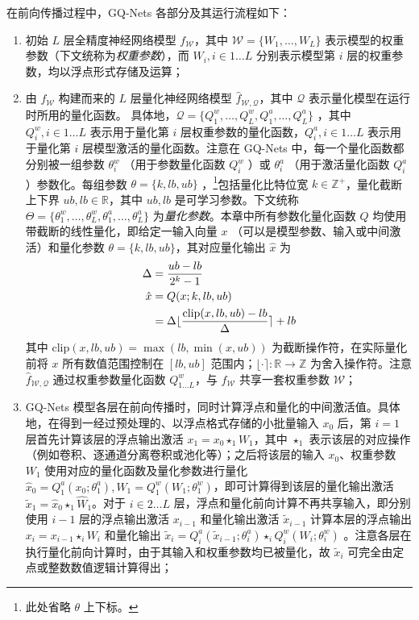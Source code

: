 在前向传播过程中，GQ-Nets 各部分及其运行流程如下：
\begin{enumerate}[1.]
  \item 初始 $L$ 层全精度神经网络模型 $f_{\mathcal{W}}$，其中 $\mathcal{W} = \{W_1, \ldots, W_L\}$ 表示模型的权重参数（下文统称为\emph{权重参数}），而 $W_i, i \in 1 \ldots L$ 分别表示模型第 $i$ 层的权重参数，均以浮点形式存储及运算；
  \item 由 $f_{\mathcal{W}}$ 构建而来的 $L$ 层量化神经网络模型 $\hat{f}_{\mathcal{W}, \mathcal{Q}}$，其中 $\mathcal{Q}$ 表示量化模型在运行时所用的量化函数。 具体地，$\mathcal{Q} = \{Q^w_1, \ldots , Q^w_L, Q^a_1, \ldots , Q^a_L\}$ ，其中 $Q^w_i, i \in 1\ldots L$ 表示用于量化第 $i$ 层权重参数的量化函数，$Q^a_i, i \in 1\ldots L$ 表示用于量化第 $i$ 层模型激活的量化函数。注意在 GQ-Nets 中，每一个量化函数都分别被一组参数 $\theta^w_i$ （用于参数量化函数 $Q^w_i$ ）或 $\theta^a_i$ （用于激活量化函数 $Q^a_i$ ）参数化。每组参数 $\theta = \{k, lb, ub\}$ ，\footnote{此处省略 $\theta$ 上下标。}包括量化比特位宽 $k \in \mathbb{Z}^+$，量化截断上下界 $ub, lb \in \mathbb{R}$，其中 $ub, lb$ 是可学习参数。下文统称 $\Theta = \{\theta^w_1, \ldots , \theta^w_L, \theta^a_1, \ldots , \theta^a_L\}$ 为\emph{量化参数}。本章中所有参数化量化函数 $Q$ 均使用带截断的线性量化，即给定一输入向量 $x$ （可以是模型参数、输入或中间激活）和量化参数 $\theta = \{k, lb, ub\}$，其对应量化输出 $\hat{x}$ 为
  \begin{align}
    \Delta &= \frac{ub - lb}{2^k - 1} \\
    \hat{x} &= Q(x; k, lb, ub) \notag \\
            &= \Delta \lfloor \frac{\mathrm{clip}(x, lb, ub) - lb}{\Delta} \rceil + lb \label{eq::gq_nets::linear_q_func}
  \end{align}
  其中 $\mathrm{clip}(x, lb, ub) = \max(lb, \min(x, ub))$ 为截断操作符，在实际量化前将 $x$ 所有数值范围控制在 $[lb, ub]$ 范围内；$\lfloor\cdot\rceil: \mathbb{R}\to\mathbb{Z}$ 为舍入操作符。注意 $\hat{f}_{\mathcal{W}, \mathcal{Q}}$ 通过权重参数量化函数 $Q^w_{1\ldots L}$，与 $f_{\mathcal{W}}$ 共享一套权重参数 $\mathcal{W}$；
  \item GQ-Nets 模型各层在前向传播时，同时计算浮点和量化的中间激活值。具体地，在得到一经过预处理的、以浮点格式存储的小批量输入 $x_0$ 后，第 $i=1$ 层首先计算该层的浮点输出激活 $x_1 = x_0 \star_1 W_1$，其中 $\star_1$ 表示该层的对应操作（例如卷积、逐通道分离卷积或池化等）；之后将该层的输入 $x_0$、权重参数 $W_1$ 使用对应的量化函数及量化参数进行量化 $\hat{x}_0 = Q^a_1(x_0; \theta^a_1), \hat{W}_1 = Q^w_1(W_1; \theta^w_1)$，即可计算得到该层的量化输出激活 $\tilde{x}_1 = \hat{x}_0 \star_1 \hat{W}_1$。对于 $i\in 2\ldots L$ 层，浮点和量化前向计算不再共享输入，即分别使用 $i-1$ 层的浮点输出激活 $x_{i-1}$ 和量化输出激活 $\tilde{x}_{i-1}$ 计算本层的浮点输出 $x_i = x_{i-1} \star_i W_i$ 和量化输出 $\tilde{x}_i = Q^a_i(\tilde{x}_{i-1}; \theta^a_i) \star_i Q^w_i({W}_{i}; \theta^w_i)$ 。注意各层在执行量化前向计算时，由于其输入和权重参数均已被量化，故 $\tilde{x}_i$ 可完全由定点或整数数值逻辑计算得出；

\end{enumerate}
